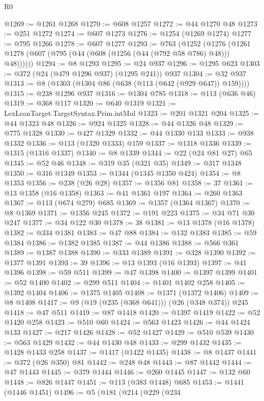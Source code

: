 \begin{lexlean}{R0}
\begin{coremodule}
@1269 := @1261 @1268
@1270 := @608 @1257
@1272 := @44 @1270 @48
@1273 := @251 @1272
@1274 := @607 @1273
@1276 := @1254 (@1269 @1274)
@1277 := @795 @1266
@1278 := @607 @1277
@1293 := @763
    (@1252 (@1276 (@1261 @1278 (@607 (@795 (@44 (@608 (@1256 (@44 (@792 @58 @786) @48))) @48))))))
@1294 := @8 @1293
@1295 := @24 @937
@1296 := @1295 @623
@1303 := @372 (@24 (@479 @1296 @937) (@1295 @241)) @937
@1304 := @32 @937
@1313 := @8 (@1303 (@1304 @86 (@638 (@113 (@642 (@929 @647)) @159))))
@1315 := @238 @1296 @937
@1316 := @1304 @785
@1318 := @113 (@636 @46)
@1319 := @368 @117
@1320 := @640 @1319
@1321 := LexLeanTarget.TargetSyntax.Prim.intMul
@1323 := @201 @1321 @204
@1325 := @44 @1323 @48
@1326 := @924 @1325
@1328 := @44 @1326 @48
@1329 := @775 @1328
@1330 := @427 @1329
@1332 := @44 @1330 @133
@1333 := @938 @1332
@1336 := @113 (@1320 @1333) @159
@1337 := @1318 @1336
@1339 := @1315 (@1316 @1337)
@1340 := @8 @1339
@1344 := @22 (@24 @81 @27) @65
@1345 := @52 @46
@1348 := @319 @35 (@321 @35)
@1349 := @317 @1348
@1350 := @316 @1349
@1353 := @1344 (@1345 @1350 @424)
@1354 := @8 @1353
@1356 := @238 (@26 @28)
@1357 := @1356 @81
@1358 := 37
@1361 := @13 @1358 (@16 @1358)
@1363 := @41 @1361 @197
@1364 := @260 @1363
@1367 := @113 (@674 @279) @685
@1369 := @1357 (@1364 @1367)
@1370 := @8 @1369
@1371 := @1356 @245
@1372 := @191 @223
@1375 := @34 @71 @30 @247
@1377 := @34 @122 @30
@1378 := 38
@1381 := @13 @1378 (@16 @1378)
@1382 := @334 @1381
@1383 := @47 @88
@1384 := @132 @1383
@1385 := @59 @1384
@1386 := @1382 @1385
@1387 := @44 @1386
@1388 := @566 @361
@1389 := @1387 @1388
@1390 := @333 @1389
@1391 := @328 @1390
@1392 := @1377 @1391
@1393 := 39
@1396 := @13 @1393 (@16 @1393)
@1397 := @41 @1396
@1398 := @59 @511
@1399 := @47 @1398
@1400 := @1397 @1399
@1401 := @52 @1400
@1402 := @299 @511
@1404 := @1401 @1402 @258
@1405 := @1392 @1404
@1406 := @1375 @1405
@1408 := @1371 (@1372 @1406)
@1409 := @8 @1408
@1417 := @9 (@19 (@235 (@368 @641))) (@26 (@348 @374)) @245
@1418 := @47 @511
@1419 := @87 @1418
@1420 := @1397 @1419
@1422 := @52 @1420 @258
@1423 := @510 @60
@1424 := @563 @1423
@1426 := @44 @1424 @133
@1427 := @217 @1426
@1428 := @52 @1427
@1429 := @510 @539
@1430 := @563 @1429
@1432 := @44 @1430 @48
@1433 := @299 @1432
@1435 := @1428 @1433 @258
@1437 := @1417 (@1422 @1435)
@1438 := @8 @1437
@1441 := @372 (@26 @350) @81
@1442 := @248 @48
@1443 := @87 @1442
@1444 := @47 @1443
@1445 := @379 @1444
@1446 := @260 @1445
@1447 := @132 @60
@1448 := @826 @1447
@1451 := @113 (@383 @1448) @685
@1453 := @1441 (@1446 @1451)
@1496 := @5
    (@181
      (@214
        (@229
          (@234

\end{coremodule}
\end{lexlean}
